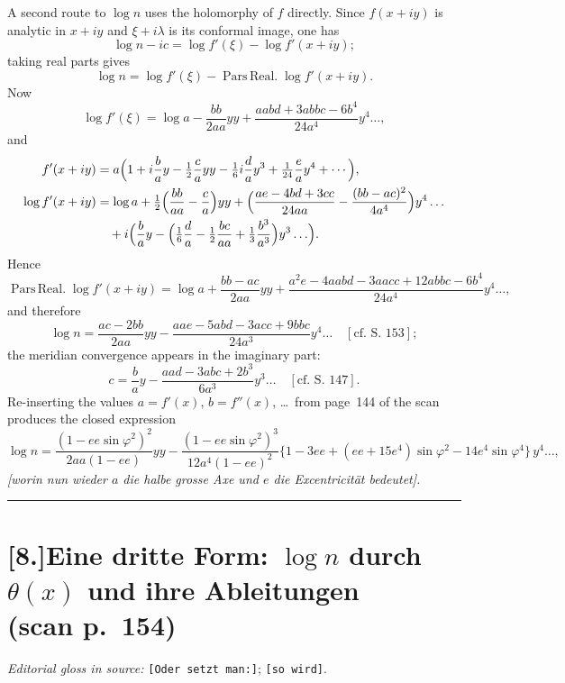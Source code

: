 \documentclass[12pt,a4paper]{article}
\begin{document}
A second route to $\log n$ uses the holomorphy of $f$ directly. Since
$f(x+iy)$ is analytic in $x+iy$ and $\xi+i\lambda$ is its conformal
image, one has
\[
   \log n - ic = \log f'(\xi)-\log f'(x+iy);
\]
taking real parts gives
\[
   \log n = \log f'(\xi) - \operatorname{Pars\,Real.}\log f'(x+iy).
\]
Now
\[
   \log f'(\xi) = \log a - \frac{bb}{2aa}yy
       + \frac{aabd+3abbc-6b^{4}}{24a^{4}}y^{4}\ldots,
\]
and
\begin{align*}
   f'(x+iy)
   &= a\Bigl(1+i\frac{b}{a}y - \tfrac{1}{2}\frac{c}{a}yy
       - \tfrac{1}{6}i\frac{d}{a}y^{3} + \tfrac{1}{24}\frac{e}{a}y^{4}
       + \cdots\Bigr),\\
   \log f'(x+iy)
   &= \log a + \tfrac{1}{2}\Bigl(\frac{bb}{aa}-\frac{c}{a}\Bigr)yy
       + \Bigl(\frac{ae-4bd+3cc}{24aa}
                - \frac{(bb-ac)^{2}}{4a^{4}}\Bigr)y^{4}\ldots\\
   &\quad + i\Bigl(\frac{b}{a}y
        - \Bigl(\tfrac{1}{6}\frac{d}{a} - \tfrac{1}{2}\frac{bc}{aa}
                + \tfrac{1}{3}\frac{b^{3}}{a^{3}}\Bigr)y^{3}\ldots\Bigr).
\end{align*}
Hence
\[
   \operatorname{Pars\,Real.}\log f'(x+iy)
     = \log a + \frac{bb-ac}{2aa}yy
       + \frac{a^{2}e-4aabd-3aacc+12abbc-6b^{4}}{24a^{4}}y^{4}\ldots,
\]
and therefore
\[
   \log n = \frac{ac-2bb}{2aa}yy
     - \frac{aae-5abd-3acc+9bbc}{24a^{3}}y^{4}\ldots\quad[\text{cf.\ S.~153}];
\]
the meridian convergence appears in the imaginary part:
\[
   c = \frac{b}{a}y - \frac{aad-3abc+2b^{3}}{6a^{3}}y^{3}\ldots\quad[\text{cf.\ S.~147}].
\]
Re-inserting the values $a=f'(x)$, $b=f''(x)$, \dots\ from page~144 of
the scan produces the closed expression
\[
   \log n
     = \frac{(1-ee\sin\varphi^{2})^{2}}{2aa(1-ee)}yy
       - \frac{(1-ee\sin\varphi^{2})^{3}}{12a^{4}(1-ee)^{2}}
            \bigl\{1-3ee+(ee+15e^{4})\sin\varphi^{2}-14e^{4}\sin\varphi^{4}\bigr\}\,y^{4}\ldots,
\]
\noindent\textit{[worin nun wieder $a$ die halbe grosse Axe und $e$ die Excentricit\"at bedeutet].}

\bigskip
\hrule
\bigskip

\section*{[8.]\quad Eine dritte Form: $\log n$ durch $\theta(x)$ und ihre Ableitungen\\(scan p.~154)}

\textit{Editorial gloss in source:} \texttt{[Oder setzt man:]}; \texttt{[so wird]}.
\end{document}

